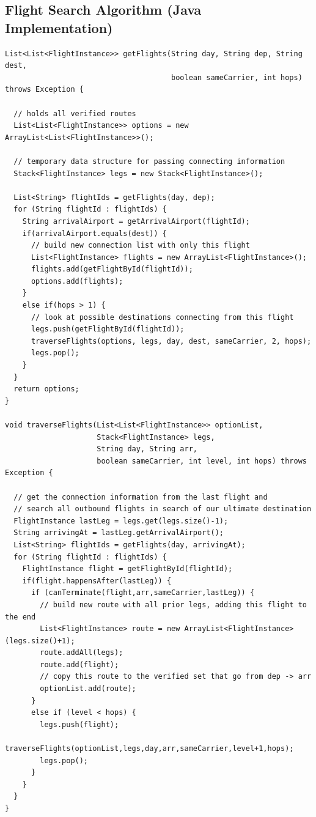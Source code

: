 \documentclass[twocolumn]{article}
\begin{document}
\begin{@twocolumnfalse}
\newpage

\section{Flight Search Algorithm (Java Implementation)}\label{apx:flightSearchJava}

\begin{verbatim}
List<List<FlightInstance>> getFlights(String day, String dep, String dest,
                                      boolean sameCarrier, int hops) throws Exception {
    
  // holds all verified routes
  List<List<FlightInstance>> options = new ArrayList<List<FlightInstance>>();
  
  // temporary data structure for passing connecting information
  Stack<FlightInstance> legs = new Stack<FlightInstance>();
  
  List<String> flightIds = getFlights(day, dep);
  for (String flightId : flightIds) {
    String arrivalAirport = getArrivalAirport(flightId);
    if(arrivalAirport.equals(dest)) {
      // build new connection list with only this flight
      List<FlightInstance> flights = new ArrayList<FlightInstance>();
      flights.add(getFlightById(flightId));
      options.add(flights);
    }
    else if(hops > 1) {
      // look at possible destinations connecting from this flight
      legs.push(getFlightById(flightId));
      traverseFlights(options, legs, day, dest, sameCarrier, 2, hops);
      legs.pop();
    }
  }
  return options;
}

void traverseFlights(List<List<FlightInstance>> optionList,
                     Stack<FlightInstance> legs,
                     String day, String arr,
                     boolean sameCarrier, int level, int hops) throws Exception {

  // get the connection information from the last flight and
  // search all outbound flights in search of our ultimate destination
  FlightInstance lastLeg = legs.get(legs.size()-1);
  String arrivingAt = lastLeg.getArrivalAirport();
  List<String> flightIds = getFlights(day, arrivingAt);
  for (String flightId : flightIds) {
    FlightInstance flight = getFlightById(flightId);
    if(flight.happensAfter(lastLeg)) {
      if (canTerminate(flight,arr,sameCarrier,lastLeg)) {
        // build new route with all prior legs, adding this flight to the end
        List<FlightInstance> route = new ArrayList<FlightInstance>(legs.size()+1);
        route.addAll(legs);
        route.add(flight);
        // copy this route to the verified set that go from dep -> arr
        optionList.add(route);
      }
      else if (level < hops) {
        legs.push(flight);
        traverseFlights(optionList,legs,day,arr,sameCarrier,level+1,hops);
        legs.pop();
      }
    }
  }
}


\end{verbatim}
\end{@twocolumnfalse}
\end{document}
